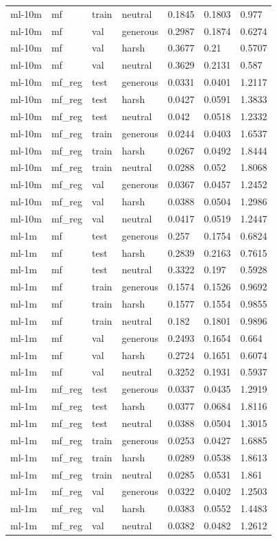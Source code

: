 \begin{table}[h]
\begin{tabular}{lllllll}
ml-10m & mf & train & neutral & 0.1845 & 0.1803 & 0.977 \\
ml-10m & mf & val & generous & 0.2987 & 0.1874 & 0.6274 \\
ml-10m & mf & val & harsh & 0.3677 & 0.21 & 0.5707 \\
ml-10m & mf & val & neutral & 0.3629 & 0.2131 & 0.587 \\
ml-10m & mf\_reg & test & generous & 0.0331 & 0.0401 & 1.2117 \\
ml-10m & mf\_reg & test & harsh & 0.0427 & 0.0591 & 1.3833 \\
ml-10m & mf\_reg & test & neutral & 0.042 & 0.0518 & 1.2332 \\
ml-10m & mf\_reg & train & generous & 0.0244 & 0.0403 & 1.6537 \\
ml-10m & mf\_reg & train & harsh & 0.0267 & 0.0492 & 1.8444 \\
ml-10m & mf\_reg & train & neutral & 0.0288 & 0.052 & 1.8068 \\
ml-10m & mf\_reg & val & generous & 0.0367 & 0.0457 & 1.2452 \\
ml-10m & mf\_reg & val & harsh & 0.0388 & 0.0504 & 1.2986 \\
ml-10m & mf\_reg & val & neutral & 0.0417 & 0.0519 & 1.2447 \\
ml-1m & mf & test & generous & 0.257 & 0.1754 & 0.6824 \\
ml-1m & mf & test & harsh & 0.2839 & 0.2163 & 0.7615 \\
ml-1m & mf & test & neutral & 0.3322 & 0.197 & 0.5928 \\
ml-1m & mf & train & generous & 0.1574 & 0.1526 & 0.9692 \\
ml-1m & mf & train & harsh & 0.1577 & 0.1554 & 0.9855 \\
ml-1m & mf & train & neutral & 0.182 & 0.1801 & 0.9896 \\
ml-1m & mf & val & generous & 0.2493 & 0.1654 & 0.664 \\
ml-1m & mf & val & harsh & 0.2724 & 0.1651 & 0.6074 \\
ml-1m & mf & val & neutral & 0.3252 & 0.1931 & 0.5937 \\
ml-1m & mf\_reg & test & generous & 0.0337 & 0.0435 & 1.2919 \\
ml-1m & mf\_reg & test & harsh & 0.0377 & 0.0684 & 1.8116 \\
ml-1m & mf\_reg & test & neutral & 0.0388 & 0.0504 & 1.3015 \\
ml-1m & mf\_reg & train & generous & 0.0253 & 0.0427 & 1.6885 \\
ml-1m & mf\_reg & train & harsh & 0.0289 & 0.0538 & 1.8613 \\
ml-1m & mf\_reg & train & neutral & 0.0285 & 0.0531 & 1.861 \\
ml-1m & mf\_reg & val & generous & 0.0322 & 0.0402 & 1.2503 \\
ml-1m & mf\_reg & val & harsh & 0.0383 & 0.0552 & 1.4483 \\
ml-1m & mf\_reg & val & neutral & 0.0382 & 0.0482 & 1.2612 \\
\bottomrule
\end{tabular}
\end{table}
